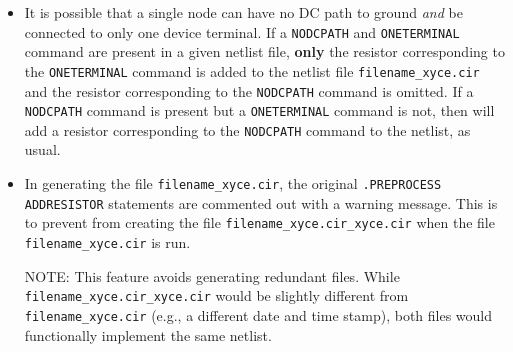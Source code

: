 \begin{itemize}
\item It is possible that a single node can have no DC path to ground 
{\em and} be connected to only one device terminal.  If a \texttt{NODCPATH}
and \texttt{ONETERMINAL} command are present in a given netlist file, {\bf only}
the resistor corresponding to the \texttt{ONETERMINAL} command is added to 
the netlist file \texttt{filename\_xyce.cir} and the resistor corresponding to 
the \texttt{NODCPATH} command is omitted.  If a \texttt{NODCPATH} command is 
present but a \texttt{ONETERMINAL} command is not, then \Xyce{} will add a resistor corresponding
to the \texttt{NODCPATH} command to the netlist, as usual.
\item In generating the file \texttt{filename\_xyce.cir}, the original 
\texttt{.PREPROCESS ADDRESISTOR} statements are commented out with a warning 
message.  This is to prevent \Xyce{} from creating the file 
\texttt{filename\_xyce.cir\_xyce.cir} when the file \texttt{filename\_xyce.cir} is
run.  

NOTE:	 This feature avoids generating redundant
files.  While \texttt{filename\_xyce.cir\_xyce.cir} would be slightly different 
from \texttt{filename\_xyce.cir} (e.g., a different date and time stamp), both 
files would functionally implement the same netlist.

\end{itemize}




